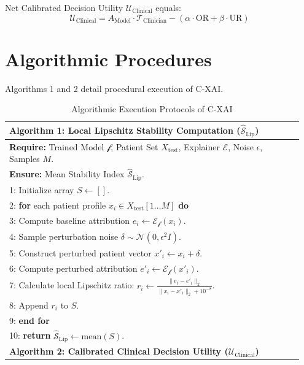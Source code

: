 \documentclass[3p,times,procedia]{elsarticle}
\theoremstyle{definition}
\begin{document}
Net Calibrated Decision Utility $\mathcal{U}_{\text{Clinical}}$ equals:
\begin{equation}
\mathcal{U}_{\text{Clinical}} = A_{\text{Model}} \cdot \mathcal{T}_{\text{Clinician}} - \left(\alpha \cdot \text{OR} + \beta \cdot \text{UR}\right)
\end{equation}

\section{Algorithmic Procedures}
Algorithms 1 and 2 detail procedural execution of C-XAI.

\begin{table}[htbp]
\centering
\caption{Algorithmic Execution Protocols of C-XAI}
\vspace{2pt}
\begin{tabular}{p{0.95\linewidth}}
\toprule
\textbf{Algorithm 1: Local Lipschitz Stability Computation ($\widehat{\mathcal{S}}_{\text{Lip}}$)}\\
\midrule
\textbf{Require:} Trained Model $\mathcal{f}$, Patient Set $X_{\text{test}}$, Explainer $\mathcal{E}$, Noise $\epsilon$, Samples $M$.\\
\textbf{Ensure:} Mean Stability Index $\widehat{\mathcal{S}}_{\text{Lip}}$.\\
1: Initialize array $S \leftarrow []$.\\
2: \textbf{for} each patient profile $x_i \in X_{\text{test}}[1 \dots M]$ \textbf{do}\\
3: \quad Compute baseline attribution $e_i \leftarrow \mathcal{E}_{\mathcal{f}}(x_i)$.\\
4: \quad Sample perturbation noise $\delta \sim \mathcal{N}(0, \epsilon^2 I)$.\\
5: \quad Construct perturbed patient vector $x'_i \leftarrow x_i + \delta$.\\
6: \quad Compute perturbed attribution $e'_i \leftarrow \mathcal{E}_{\mathcal{f}}(x'_i)$.\\
7: \quad Calculate local Lipschitz ratio: $r_i \leftarrow \frac{\|e_i - e'_i\|_2}{\|x_i - x'_i\|_2 + 10^{-8}}$.\\
8: \quad Append $r_i$ to $S$.\\
9: \textbf{end for}\\
10: \textbf{return} $\widehat{\mathcal{S}}_{\text{Lip}} \leftarrow \text{mean}(S)$.\\
\midrule
\textbf{Algorithm 2: Calibrated Clinical Decision Utility ($\mathcal{U}_{\text{Clinical}}$)}\\

\end{tabular}
\end{table}
\end{document}
